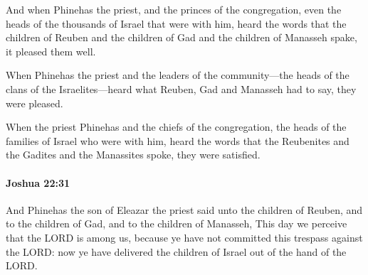 			\begin{versebox}
					\item[BHS] 
					\item[ASV] And when Phinehas the priest, and the princes of the congregation, even the heads of the thousands of Israel that were with him, heard the words that the children of Reuben and the children of Gad and the children of Manasseh spake, it pleased them well.
					\item[NIV] When Phinehas the priest and the leaders of the community—the heads of the clans of the Israelites—heard what Reuben, Gad and Manasseh had to say, they were pleased.
					\item[NRSV] When the priest Phinehas and the chiefs of the congregation, the heads of the families of Israel who were with him, heard the words that the Reubenites and the Gadites and the Manassites spoke, they were satisfied.
			\end{versebox}

		\paragraph{Joshua 22:31} %
			\label{JOSHUA-22-31}

			And Phinehas the son of Eleazar the priest said unto the children of Reuben, and to the children of Gad, and to the children of Manasseh, This day we perceive that the LORD is among us, because ye have not committed this trespass against the LORD: now ye have delivered the children of Israel out of the hand of the LORD.

